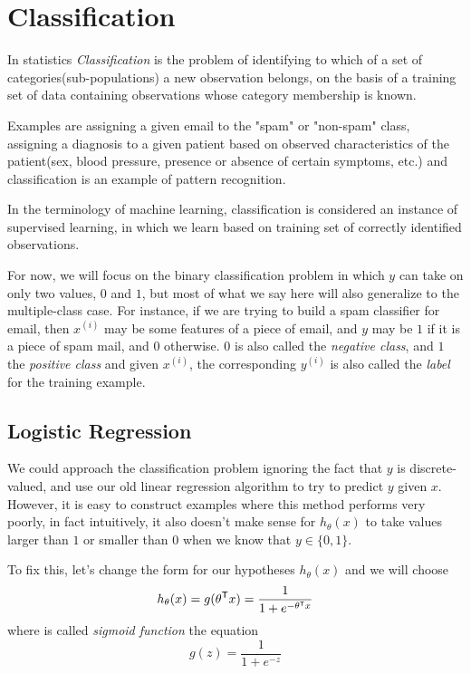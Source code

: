 \chapter{Classification}
In statistics \emph{Classification} is the problem of identifying to which of a set of categories(sub-populations)
a new observation belongs, on the basis of a training set of data containing observations 
whose category membership is known.

Examples are assigning a given email to the "spam" or "non-spam" class, assigning a diagnosis
to a given patient based on observed characteristics of the patient(sex, blood pressure, presence 
or absence of certain symptoms, etc.) and classification is an example of pattern recognition.

In the terminology of machine learning, classification is considered an instance of supervised learning, 
in which we learn based on training set of correctly identified observations.

For now, we will focus on the binary classification problem in which $y$ can take on only two values,
$0$ and $1$, but most of what we say here will also generalize to the multiple-class case.\newline
For instance, if we are trying to build a spam classifier for email, then $x^{(i)}$ may be some features
of a piece of email, and $y$ may be $1$ if it is a piece of spam mail, and $0$ otherwise.\newline
$0$ is also called the \emph{negative class}, and $1$ the \emph{positive class} and
given $x^{(i)}$, the corresponding $y^{(i)}$ is also called the \emph{label} for the training example.

\section{Logistic Regression}
We could approach the classification problem ignoring the fact that $y$ is discrete-valued,
and use our old linear regression algorithm to try to predict $y$ given $x$.\newline
However, it is easy to construct examples where this method performs very poorly, in fact intuitively,
it also doesn’t make sense for $h_{\theta}(x)$ to take values larger than $1$ or smaller than $0$
when we know that $y \in \{0,1\}$.

To fix this, let’s change the form for our hypotheses $h_{\theta}(x)$ and we will choose
\[ h_{\theta}(x) = g(\theta ^ \mathsf{T} x) = \frac{1}{1 + e^{-\theta ^ \mathsf{T} x}} \]
where is called \emph{sigmoid function} the equation
\[ g(z) = \frac{1}{1 + e^{-z}} \]

